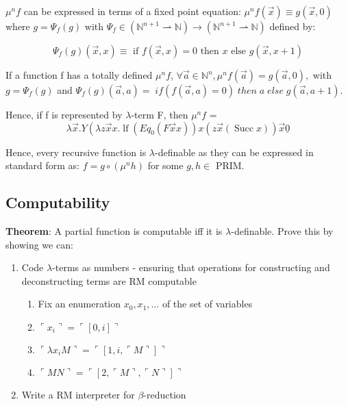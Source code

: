 \documentclass{article}
\begin{document}
$\mu ^{n} f$ can be expressed in terms of a fixed point equation: $\mu^{n} f(\vec{x}) \equiv g(\vec{x}, 0)$ where $g=\Psi_{f}(g)$ with $\Psi_{f} \in\left(\mathbb{N}^{n+1} \rightharpoonup \mathbb{N}\right) \rightarrow\left(\mathbb{N}^{n+1} \rightharpoonup \mathbb{N}\right)$ defined by:

\begin{equation}
    \Psi_{f}(g)(\vec{x}, x) \equiv \text { if } f(\vec{x}, x)=0 \text { then } x \text { else } g(\vec{x}, x+1)
\end{equation}

If a function f has a totally defined $\mu ^{n}f$, $\forall \overrightarrow{a} \in \mathbb{N}^{n}, \mu ^{n} f(\overrightarrow{a}) = g(\overrightarrow{a}, 0),$ with $g = \Psi _{f}(g)$ and $\Psi _{f}(g)(\overrightarrow{a}, a) = \;  if(f(\overrightarrow{a}, a) = 0) \; then \; a \; else \; g(\overrightarrow{a}, a+1)$.

Hence, if f is represented by $\lambda$-term F, then $\mu ^{n}f$ =
\begin{equation}
    \lambda \vec{x} . Y\left(\lambda z \vec{x} x . \operatorname{lf}\left(E q_{0}(F \vec{x} x)\right) x(z \vec{x}(\operatorname{Succ} x)) \vec{x} \underline{0}\right.
\end{equation}

Hence, every recursive function is $\lambda$-definable as they can be expressed in standard form as: $f=g \circ\left(\mu^{n} h\right)$ for some $g, h \in \text { PRIM. }$


\subsection{Computability}
\textbf{Theorem}: A partial function is computable iff it is $\lambda$-definable. Prove this by showing we can:
\begin{enumerate}
    \item Code $\lambda$-terms as numbers - ensuring that operations for constructing and deconstructing terms are RM computable
    \begin{enumerate}
        \item Fix an enumeration $x_{0}, x_{1}, ...$ of the set of variables
        \item $\ulcorner x_{i} \urcorner = \ulcorner [0, i] \urcorner$
        \item $\ulcorner \lambda x_{i} M \urcorner = \ulcorner [1, i, \ulcorner M \urcorner ] \urcorner$
        \item $\ulcorner MN \urcorner = \ulcorner [2, \ulcorner M \urcorner , \ulcorner N \urcorner ] \urcorner$
    \end{enumerate}
    \item Write a RM interpreter for $\beta$-reduction
\end{enumerate}
\end{document}
